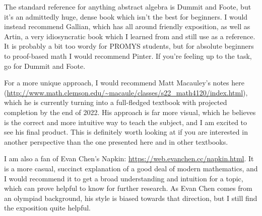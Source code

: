\documentclass[letterpaper]{article}
\newtheorem{theorem}{Theorem}[section]
\theoremstyle{definition}
\theoremstyle{remark}
\newcommand\CC{\mathbb{C}}
\begin{document}
The standard reference for anything abstract algebra is Dummit and Foote, but it's an admittedly huge, dense book which isn't the best for beginners. I would instead recommend Gallian, which has all around friendly exposition, as well as Artin, a very idiosyncratic book which I learned from and still use as a reference. It is probably a bit too wordy for PROMYS students, but for absolute beginners to proof-based math I would recommend Pinter. If you're feeling up to the task, go for Dummit and Foote. 

For a more unique approach, I would recommend Matt Macauley's notes here (\url{http://www.math.clemson.edu/~macaule/classes/s22_math4120/index.html}), which he is currently turning into a full-fledged textbook with projected completion by the end of 2022. His approach is far more visual, which he believes is the correct and more intuitive way to teach the subject, and I am excited to see his final product. This is definitely worth looking at if you are interested in another perspective than the one presented here and in other textbooks. 

I am also a fan of Evan Chen's Napkin: \url{https://web.evanchen.cc/napkin.html}. It is a more casual, succinct explanation of a good deal of modern mathematics, and I would recommend it to get a broad understanding and intuition for a topic, which can prove helpful to know for further research. As Evan Chen comes from an olympiad background, his style is biased towards that direction, but I still find the exposition quite helpful. 



\end{document}
